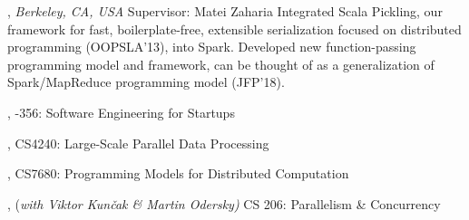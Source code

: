 \documentclass[9pt]{article}
\begin{document}
, \emph{Berkeley, CA, USA} \vspace{0.01in} 
\newline{}
\newline\noindent Supervisor: Matei Zaharia
\newline\noindent Integrated Scala Pickling, our framework for fast, boilerplate-free, extensible
\newline\noindent serialization focused on distributed programming (OOPSLA'13), into Spark.
\newline\noindent Developed new function-passing programming model and framework, can be
\newline\noindent thought of as a generalization of Spark/MapReduce programming model (JFP'18).

\bigskip

\medskip
{}

,  
\newline{}-356: Software Engineering for Startups 
\bigskip

,  
\newline\noindent CS4240: Large-Scale Parallel Data Processing 
\bigskip

, 
\newline\noindent CS7680: Programming Models for Distributed Computation 
\bigskip

, {(\em with Viktor Kun\v cak \& Martin Odersky)} 
\newline\noindent CS 206: Parallelism \& Concurrency 
\bigskip
\end{document}

